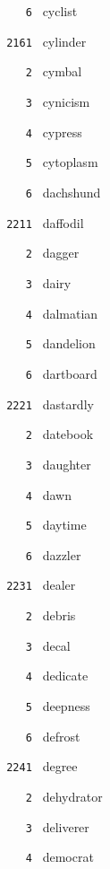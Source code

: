 \documentclass[11pt]{article}
\begin{document}
\begin{multicols}{6}
\noindent \texttt{ \ \ \ 6 } cyclist  \par
\vspace{3mm}
\noindent \texttt{ 2161 } cylinder  \par
\noindent \texttt{ \ \ \ 2 } cymbal  \par
\noindent \texttt{ \ \ \ 3 } cynicism  \par
\noindent \texttt{ \ \ \ 4 } cypress  \par
\noindent \texttt{ \ \ \ 5 } cytoplasm  \par
\noindent \texttt{ \ \ \ 6 } dachshund  \par
\noindent \texttt{ 2211 } daffodil  \par
\noindent \texttt{ \ \ \ 2 } dagger  \par
\noindent \texttt{ \ \ \ 3 } dairy  \par
\noindent \texttt{ \ \ \ 4 } dalmatian  \par
\noindent \texttt{ \ \ \ 5 } dandelion  \par
\noindent \texttt{ \ \ \ 6 } dartboard  \par
\vspace{3mm}
\noindent \texttt{ 2221 } dastardly  \par
\noindent \texttt{ \ \ \ 2 } datebook  \par
\noindent \texttt{ \ \ \ 3 } daughter  \par
\noindent \texttt{ \ \ \ 4 } dawn  \par
\noindent \texttt{ \ \ \ 5 } daytime  \par
\noindent \texttt{ \ \ \ 6 } dazzler  \par
\vspace{3mm}
\noindent \texttt{ 2231 } dealer  \par
\noindent \texttt{ \ \ \ 2 } debris  \par
\noindent \texttt{ \ \ \ 3 } decal  \par
\noindent \texttt{ \ \ \ 4 } dedicate  \par
\noindent \texttt{ \ \ \ 5 } deepness  \par
\noindent \texttt{ \ \ \ 6 } defrost  \par
\vspace{3mm}
\noindent \texttt{ 2241 } degree  \par
\noindent \texttt{ \ \ \ 2 } dehydrator  \par
\noindent \texttt{ \ \ \ 3 } deliverer  \par
\noindent \texttt{ \ \ \ 4 } democrat  \par

\end{multicols}
\end{document}
